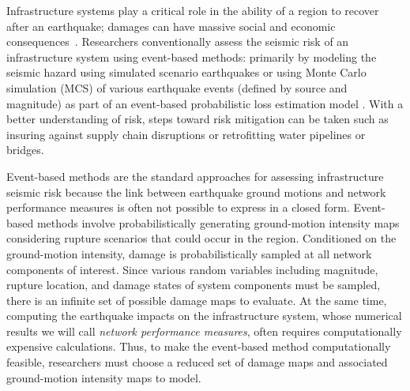 Infrastructure systems play a critical role in the ability of a region to recover after an earthquake; damages can have massive social and economic consequences~\cite{chang_measuring_2001,chang_evaluating_2003,rose_business_2002,araneda_lessons_2010}.  Researchers conventionally assess the seismic risk of an infrastructure system using event-based methods: primarily by modeling the seismic hazard using simulated scenario earthquakes \cite[e.g.,][]{romero_seismic_2010,rokneddin_bridge_2013,chang_measuring_2001} or using Monte Carlo simulation (MCS) of various earthquake events (defined by source and magnitude) as part of an event-based probabilistic loss estimation model \cite[e.g.,][]{bommer_development_2002,grossi_catastrophe_2005,crowley_modelling_2006,stergiou_treatment_2006,shiraki_system_2007,jayaram_efficient_2010}. 
With a better understanding of risk, steps toward risk mitigation can be taken such as insuring against supply chain disruptions or retrofitting water pipelines or bridges.

Event-based methods are the standard approaches for assessing infrastructure seismic risk  because the link between earthquake ground motions and network performance measures is often not possible to express in a closed form.  Event-based methods involve probabilistically generating ground-motion intensity maps considering rupture scenarios that could occur in the region. Conditioned on the ground-motion intensity, damage is probabilistically sampled at all network components of interest. %
Since various random variables including magnitude, rupture location, and damage states of system components must be sampled, there is an infinite set of possible damage maps to evaluate. At the same time, computing the earthquake impacts on the infrastructure system, whose numerical results we will call \emph{network performance measures}, often requires computationally expensive calculations. Thus, to make the event-based method computationally feasible, researchers must choose a reduced set of damage maps and associated ground-motion intensity maps to model.  

